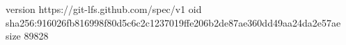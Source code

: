 version https://git-lfs.github.com/spec/v1
oid sha256:916026fb816998f80d5c6c2c1237019ffe206b2de87ae360dd49aa24da2e57ae
size 89828
